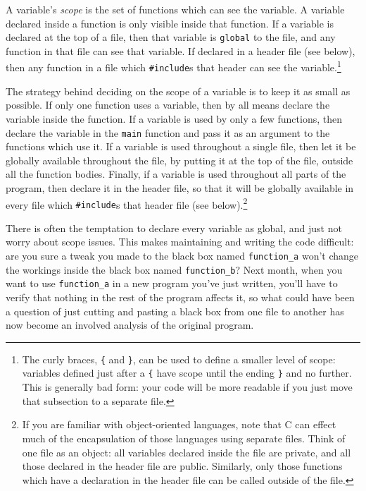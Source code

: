 \documentclass[12pt]{article}
\begin{document}
A variable's {\sl scope} is the set of functions which can see the
variable. A variable declared inside a function is only visible inside
that function.  If a variable is declared at the top of a file, then
that variable is {\tt global} to the file, and any function in that
file can see that variable. If declared in a header file (see below),
then any function in a file which {\tt \#include}s that header  can see
the variable.\footnote{The curly braces, {\tt \{} and {\tt \}}, can be
used to define a smaller level of scope: variables defined just after a
{\tt \{} have scope until the ending {\tt \}} and no further. This is
generally bad form: your code will be more readable if you just move
that subsection to a separate file.}

The strategy behind deciding on the scope of a variable is
to keep it as small as possible. If only one function uses a variable,
then by all means declare the variable inside the function.
If a variable is used by only a few functions,
then declare the variable in the {\tt main} function and pass it as an
argument to the functions which use it. If a variable is used throughout
a single file, then let it be globally available throughout the file, by
putting it at the top of the file, outside all the function bodies. Finally,
if a variable is used throughout all parts of the program, then declare it in
the header file, so that it will be globally available in every
file which {\tt \#include}s that header file (see below).\footnote{If
you are familiar with object-oriented languages, note that C can effect
much of the encapsulation of those languages using separate files. Think
of one file as an object: all variables declared inside the file are
private, and all those declared in the header file are public. Similarly,
only those functions which have a declaration in the header file can be
called outside of the file.}

There is often the temptation to declare every variable as global, and
just not worry about scope issues. This makes maintaining and writing
the code difficult: are you sure a tweak you made to the black box named
{\tt function\_a} won't change the workings inside the black box named
{\tt function\_b}? Next month, when you want to use {\tt function\_a}
in a new program you've just written, you'll have to verify that nothing
in the rest of the program affects it, so what could have been a question
of just cutting and pasting a black box from one file to another has
now become an involved analysis of the original program.  
\end{document}
